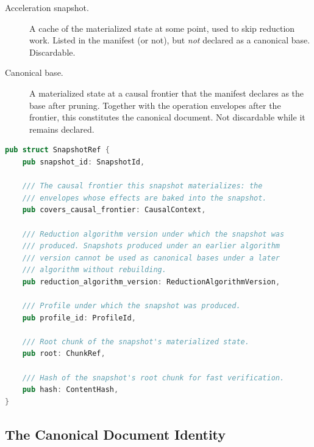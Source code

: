 \documentclass[11pt,letterpaper]{report}
\begin{document}
\begin{description}
  \item[Acceleration snapshot.] A cache of the materialized state at
    some point, used to skip reduction work. Listed in the manifest
    (or not), but \emph{not} declared as a canonical base.
    Discardable.
  \item[Canonical base.] A materialized state at a causal frontier
    that the manifest declares as the base after pruning. Together
    with the operation envelopes after the frontier, this
    constitutes the canonical document. Not discardable while it
    remains declared.
\end{description}

\begin{lstlisting}[language=Rust]
pub struct SnapshotRef {
    pub snapshot_id: SnapshotId,

    /// The causal frontier this snapshot materializes: the
    /// envelopes whose effects are baked into the snapshot.
    pub covers_causal_frontier: CausalContext,

    /// Reduction algorithm version under which the snapshot was
    /// produced. Snapshots produced under an earlier algorithm
    /// version cannot be used as canonical bases under a later
    /// algorithm without rebuilding.
    pub reduction_algorithm_version: ReductionAlgorithmVersion,

    /// Profile under which the snapshot was produced.
    pub profile_id: ProfileId,

    /// Root chunk of the snapshot's materialized state.
    pub root: ChunkRef,

    /// Hash of the snapshot's root chunk for fast verification.
    pub hash: ContentHash,
}
\end{lstlisting}

\subsection{The Canonical Document Identity}
\end{document}
